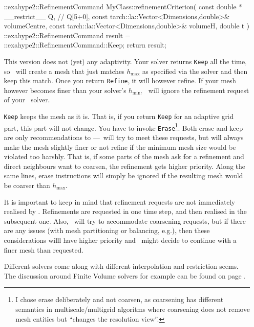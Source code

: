 \begin{code}
::exahype2::RefinementCommand MyClass::refinementCriterion(
  const double * __restrict__ Q, // Q[5+0],
  const tarch::la::Vector<Dimensions,double>&  volumeCentre,
  const tarch::la::Vector<Dimensions,double>&  volumeH,
  double                                       t
) {
  ::exahype2::RefinementCommand result = ::exahype2::RefinementCommand::Keep;
  return result;
}
\end{code}


\noindent
This version does not (yet) any adaptivity. 
Your solver returns \texttt{Keep} all the time, so \Peano\ will create a mesh
that just matches $h_{\text{max}}$ as specified via the solver and then keep
this match.
Once you return \texttt{Refine}, it will however refine.
If your mesh however becomes finer than your solver's $h_{\text{min}}$, \Peano\
will ignore the refinement request of your \ExaHyPE\ solver.


\texttt{Keep} keeps the mesh as it is.
That is, if you return \texttt{Keep} for an adaptive grid part, this part will
not change.
You have to invoke \texttt{Erase}\footnote{I chose erase deliberately and not
coarsen, as coarsening has different semantics in multiscale/multigrid
algoritms where coarsening does not remove mesh entities but ``changes the
resolution view''.}.
Both erase and keep are only recommendations to \Peano---\Peano\ will try to
meet these requests, but will always make the mesh slightly finer or not refine
if the minimum mesh size would be violated too harshly.
That is, if some parts of the mesh ask for a refinement and direct neighbours
want to coarsen, the refinement gets higher priority.
Along the same lines, erase instructions will simply be ignored if the resulting
mesh would be coarser than $h_{\text{max}}$.


\begin{remark}
It is important to keep in mind that refinement requests are not
immediately realised by \Peano. 
Refinements are requested in one time step, and then realised in the subsequent
one.
Also, \Peano\ will try to accommodate coarsening requests, but if there are any issues (with mesh partitioning or balancing, e.g.), then these
considerations willl have higher priority and \Peano\ might decide to continue with a finer mesh than requested.
\end{remark}


\noindent
Different solvers come along with different interpolation and restriction seems.
The discussion around Finite Volume solvers for example can be found on page
\pageref{section:exahype:finite-volumes:interpolation-schemes}.


